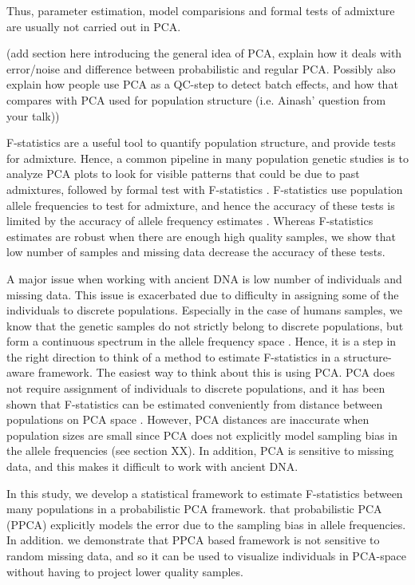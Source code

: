 \documentclass[12pt, letterpaper]{article}
\begin{document}
Thus, parameter estimation, model comparisions and formal tests of admixture are usually not carried out in PCA. 

(add section here introducing the general idea of PCA, explain how it deals with error/noise  and difference between probabilistic and regular PCA. Possibly also explain how people use PCA as a QC-step to detect batch effects, and how that compares with PCA used for population structure (i.e. Ainash' question from your talk))

F-statistics are a useful tool to quantify population structure, and provide tests for admixture. Hence, a common pipeline in many population genetic studies is to analyze PCA plots to look for visible patterns that could be due to past admixtures, followed by formal test with F-statistics \cite{lazaridis_ancient_2014,lazaridis_genomic_2016}. F-statistics use population allele frequencies to test for admixture, and hence the accuracy of these tests is limited by the accuracy of allele frequency estimates \cite{peter_admixture_2016}. Whereas F-statistics estimates are robust when there are enough high quality samples, we show that low number of samples and missing data decrease the accuracy of these tests.

A major issue when working with ancient DNA is low number of individuals and missing data. This issue is exacerbated due to difficulty in assigning some of the individuals to discrete populations. Especially in the case of humans samples, we know that the genetic samples do not strictly belong to discrete populations, but form a continuous spectrum in the allele frequency space \cite{oteo-garcia_geometrical_2021}. Hence, it is a step in the right direction to think of a method to estimate F-statistics in a structure-aware framework. The easiest way to think about this is using PCA. PCA does not require assignment of individuals to discrete populations, and it has been shown that F-statistics can be estimated conveniently from distance between populations on PCA space \cite{peter_geometric_2022}. However, PCA distances are inaccurate when population sizes are small since PCA does not explicitly model sampling bias in the allele frequencies (see section XX). In addition, PCA is sensitive to missing data, and this makes it difficult to work with ancient DNA. 



In this study, we develop a statistical framework to estimate F-statistics between many populations in a probabilistic PCA framework.  that probabilistic PCA (PPCA) explicitly models the error due to the sampling bias in allele frequencies. In addition. we demonstrate that PPCA based framework is not sensitive to random missing data, and so it can be used to visualize individuals in PCA-space without having to project lower quality samples.
\end{document}
